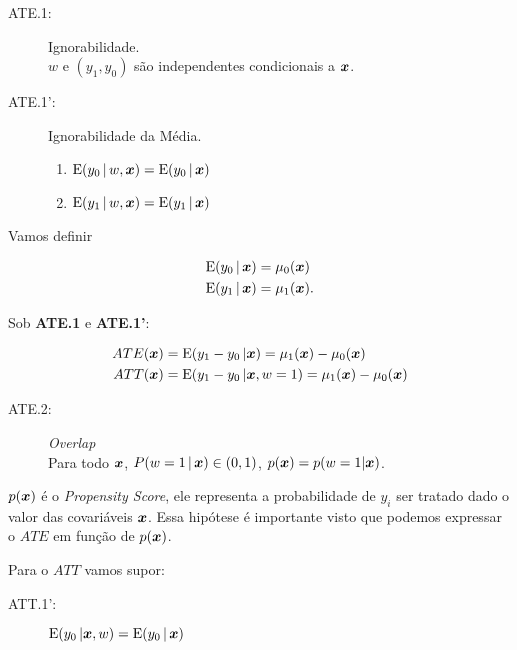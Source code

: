 \documentclass[11pt, oneside, a4paper, article]{article}
\numberwithin{equation}{section}
\begin{document}
\begin{description}
\begin{description}
\item[ATE.1:] Ignorabilidade. 
\\
$w$ e $(y_{1}, y_{0})$ são independentes condicionais a $\boldsymbol{x}$.

\item[ATE.1':] Ignorabilidade da Média. 

\vspace{-.75 em}
\begin{enumerate}[label =\alph*)] \itemsep0pt
\item $\text{E}( y_{0} \, | \, w, \boldsymbol{x} ) = \text{E}( y_{0} \, | \, \boldsymbol{x} )$
\item $\text{E}( y_{1} \, | \, w, \boldsymbol{x} ) = \text{E}( y_{1} \, | \, \boldsymbol{x} )$
\end{enumerate}

\end{description}

Vamos definir

\vspace{-1 em}
\begin{align*}
\text{E}( y_{0} \, | \, \boldsymbol{x} ) &= \mu_{0}( \boldsymbol{x} )
\\
\text{E}( y_{1} \, | \, \boldsymbol{x} ) &= \mu_{1}( \boldsymbol{x} ).
\end{align*}

Sob \textbf{ATE.1} e \textbf{ATE.1'}:

\vspace{-1 em}
\begin{align*}
	ATE( \boldsymbol{x} ) &= \text{E}( y_{1} - y_{0} \, | \boldsymbol{x} ) = \mu_{1}(\boldsymbol{x}) - \mu_{0}(\boldsymbol{x}) 
	\\
	ATT( \boldsymbol{x} ) &= \text{E}( y_{1} - y_{0} \, | \boldsymbol{x}, w=1 ) = \mu_{1}(\boldsymbol{x}) - \mu_{0}(\boldsymbol{x}) 
\end{align*}

\begin{description}
\item[ATE.2:] \textit{Overlap} \\
Para todo $\boldsymbol{x}$, $P(w=1 \, | \, \boldsymbol{x} ) \in ( 0, 1 )$, 
$p(\boldsymbol{x}) = p(w=1 | \boldsymbol{x})$.
\end{description}

$p(\boldsymbol{x})$ é o \textit{Propensity Score}, ele representa a probabilidade de $y_{i}$ ser tratado dado o valor das covariáveis $\boldsymbol{x}$.
Essa hipótese é importante visto que podemos expressar o $ATE$ em função de $p(\boldsymbol{x})$.

\vspace{1 em}
Para o $ATT$ vamos supor:

\begin{description}
\item[ATT.1':] 
	$\text{E}( y_{0} \, | \boldsymbol{x}, w ) = \text{E}( y_{0} \, | \, \boldsymbol{x} )$


\end{description}
\end{description}
\end{document}

